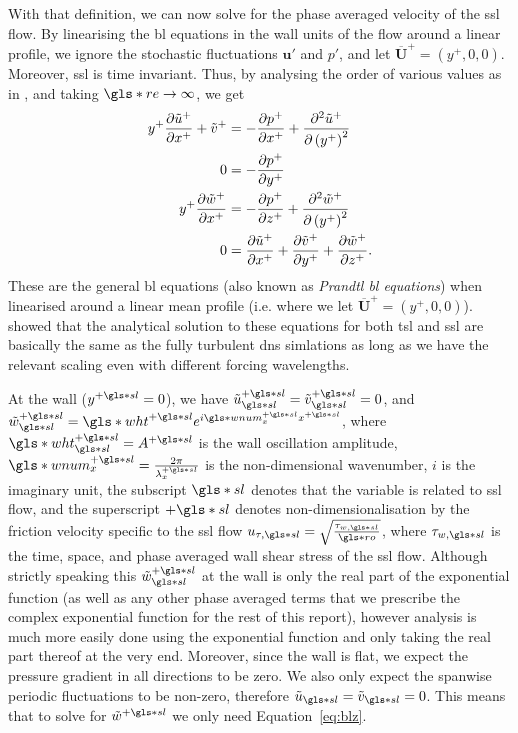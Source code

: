 With that definition, we can now solve for the phase averaged velocity of the \gls*{ssl} flow. By linearising the \gls*{bl} equations in the wall units of the flow around a linear profile, we ignore the stochastic fluctuations $\mathbf{u'} $ and $p'$, and let $\overline{\mathbf{U} }^{+} = (y^{+},0,0)$. Moreover, \gls*{ssl} is time invariant. Thus, by analysing the order of various values as in \cite{schlichting2016}, and taking $\gls*{re}\to \infty$, we get
\begin{align}
	y^{+} \pdv{\tilde{u}^{+}}{x^{+}} + \tilde{v}^{+} &= -\pdv{p^{+}}{x^{+}} + \pdv[2]{\tilde{u}^{+}}{\left(y^{+}\right)} \label{eq:blx}\\
	0 &= -\pdv{p^{+}}{y^{+}}  \label{eq:bly}\\
	y^{+} \pdv{\tilde{w}^{+}}{x^{+}} &= -\pdv{p^{+}}{z^{+}} + \pdv[2]{\tilde{w}^{+}}{\left( y^{+} \right) } \label{eq:blz}\\
	0 &= \pdv{\tilde{u}^{+}}{x^{+}} +\pdv{\tilde{v}^{+}}{y^{+}} +\pdv{\tilde{w}^{+}}{z^{+}} \label{eq:blc}
.\end{align}
These are the general \gls*{bl} equations (also known as \textit{Prandtl \gls*{bl} equations}) when linearised around a linear mean profile (i.e. where we let $\overline{\mathbf{ U}}^{+}=\left(y^{+},0,0\right)$). \textcite{viotti2009} showed that the analytical solution to these equations for both \gls*{tsl} and \gls*{ssl} are basically the same as the fully turbulent \gls*{dns} simlations as long as we have the relevant scaling even with different forcing wavelengths.

At the wall ($y\ps=0$), we have $\tilde{u}\ssl\ps=\tilde{v}\ssl\ps=0$, and $\tilde{w}\ssl\ps=\gls*{wht}\ps e^{i \gls*{wnum}_x\ps x\ps}$, where $\gls*{wht}\ps\ssl=A\ps$ is the wall oscillation amplitude, $\gls*{wnum}_x\ps = \frac{2\pi}{\lambda_x\ps}$ is the non-dimensional wavenumber, $i$ is the imaginary unit, the subscript $\gls*{sl}$ denotes that the variable is related to \gls*{ssl} flow, and the superscript $+\gls*{sl}$ denotes non-dimensionalisation by the friction velocity specific to the \gls*{ssl} flow $u_{\tau,\gls*{sl}}=\sqrt{\frac{\tau_{w,\gls*{sl}}}{\gls*{ro}}} $, where $\tau_{w,\gls*{sl}}$ is the time, space, and phase averaged wall shear stress of the  \gls*{ssl} flow. Although strictly speaking this $\tilde{w}\ssl\ps$ at the wall is only the real part of the exponential function (as well as any other phase averaged terms that we prescribe the complex exponential function for the rest of this report), however analysis is much more easily done using the exponential function and only taking the real part thereof at the very end. Moreover, since the wall is flat, we expect the pressure gradient in all directions to be zero. We also only expect the spanwise periodic fluctuations to be non-zero, therefore $\tilde{u}\ssl=\tilde{v}\ssl=0  $. This means that to solve for $\tilde{w}\ps$ we only need Equation~\eqref{eq:blz}.

